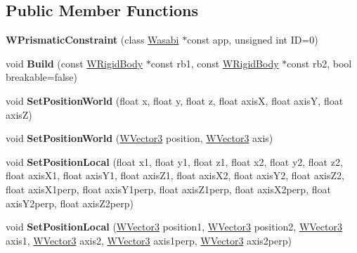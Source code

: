 \subsection*{Public Member Functions}
\begin{DoxyCompactItemize}
\item 
{\bfseries W\+Prismatic\+Constraint} (class \hyperlink{class_wasabi}{Wasabi} $\ast$const app, unsigned int ID=0)\hypertarget{class_w_prismatic_constraint_a58b0db51ad33a74dfa5294d110e1c38d}{}\label{class_w_prismatic_constraint_a58b0db51ad33a74dfa5294d110e1c38d}

\item 
void {\bfseries Build} (const \hyperlink{class_w_rigid_body}{W\+Rigid\+Body} $\ast$const rb1, const \hyperlink{class_w_rigid_body}{W\+Rigid\+Body} $\ast$const rb2, bool breakable=false)\hypertarget{class_w_prismatic_constraint_a498041b77ad9b43d7a58896cc8e8062e}{}\label{class_w_prismatic_constraint_a498041b77ad9b43d7a58896cc8e8062e}

\item 
void {\bfseries Set\+Position\+World} (float x, float y, float z, float axisX, float axisY, float axisZ)\hypertarget{class_w_prismatic_constraint_a27057fbcf00d1cd965ea678c76b6b481}{}\label{class_w_prismatic_constraint_a27057fbcf00d1cd965ea678c76b6b481}

\item 
void {\bfseries Set\+Position\+World} (\hyperlink{class_w_vector3}{W\+Vector3} position, \hyperlink{class_w_vector3}{W\+Vector3} axis)\hypertarget{class_w_prismatic_constraint_ae4d868231daa739af0b885224c43fa3d}{}\label{class_w_prismatic_constraint_ae4d868231daa739af0b885224c43fa3d}

\item 
void {\bfseries Set\+Position\+Local} (float x1, float y1, float z1, float x2, float y2, float z2, float axis\+X1, float axis\+Y1, float axis\+Z1, float axis\+X2, float axis\+Y2, float axis\+Z2, float axis\+X1perp, float axis\+Y1perp, float axis\+Z1perp, float axis\+X2perp, float axis\+Y2perp, float axis\+Z2perp)\hypertarget{class_w_prismatic_constraint_a2dccb56187ae04e3f87d14fa70a36644}{}\label{class_w_prismatic_constraint_a2dccb56187ae04e3f87d14fa70a36644}

\item 
void {\bfseries Set\+Position\+Local} (\hyperlink{class_w_vector3}{W\+Vector3} position1, \hyperlink{class_w_vector3}{W\+Vector3} position2, \hyperlink{class_w_vector3}{W\+Vector3} axis1, \hyperlink{class_w_vector3}{W\+Vector3} axis2, \hyperlink{class_w_vector3}{W\+Vector3} axis1perp, \hyperlink{class_w_vector3}{W\+Vector3} axis2perp)\hypertarget{class_w_prismatic_constraint_ada1679da859e5b89e5b08f064348f156}{}\label{class_w_prismatic_constraint_ada1679da859e5b89e5b08f064348f156}


\end{DoxyCompactItemize}
